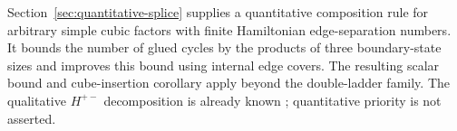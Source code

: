 Section~\ref{sec:quantitative-splice} supplies a quantitative composition rule
for arbitrary simple cubic factors with finite Hamiltonian edge-separation
numbers. It bounds the number of glued cycles by the products of three
boundary-state sizes and improves this bound using internal edge covers.
The resulting scalar bound and cube-insertion corollary apply beyond the
double-ladder family. The qualitative $H^{+-}$ decomposition is already known
\citep{GorskySteinerWiederrecht2023}; quantitative priority is not asserted.
